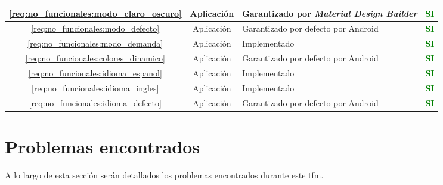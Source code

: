 \begin{xltabular}{\textwidth}{|c|c|X|c|}
        \hline
        \ref{req:no_funcionales:modo_claro_oscuro} & Aplicación & Garantizado por \textit{Material Design Builder} \cite{material_design_material_nodate-1} & \textcolor{green}{\textbf{SI}} \\
        \hline
        \ref{req:no_funcionales:modo_defecto} & Aplicación & Garantizado por defecto por Android & \textcolor{green}{\textbf{SI}} \\
        \hline
        \ref{req:no_funcionales:modo_demanda} & Aplicación & Implementado & \textcolor{green}{\textbf{SI}} \\
        \hline
        \ref{req:no_funcionales:colores_dinamico} & Aplicación & Garantizado por defecto por Android & \textcolor{green}{\textbf{SI}} \\
        \hline
        \ref{req:no_funcionales:idioma_espanol} & Aplicación & Implementado & \textcolor{green}{\textbf{SI}} \\
        \hline
        \ref{req:no_funcionales:idioma_ingles} & Aplicación & Implementado & \textcolor{green}{\textbf{SI}} \\
        \hline
        \ref{req:no_funcionales:idioma_defecto} & Aplicación & Garantizado por defecto por Android & \textcolor{green}{\textbf{SI}} \\
        \hline
    \end{xltabular}

\section{Problemas encontrados}
    \label{section:problemas}

    A lo largo de esta sección serán detallados los problemas encontrados durante este \gls{tfm}.
    
